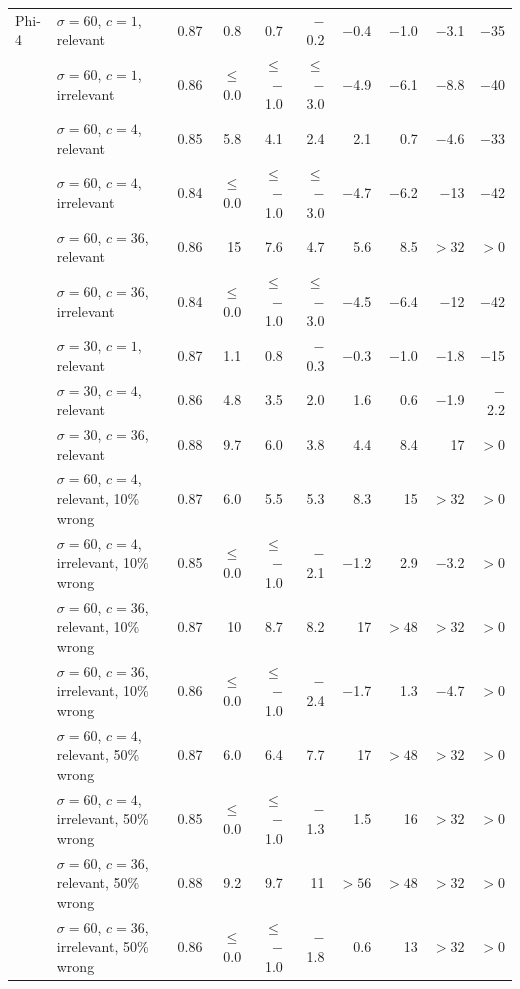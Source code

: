 \begin{tabular}{llrrrrrrrr}
\midrule
Phi-4 & $\sigma = 60$, $c = 1$, relevant & 0.87 & 0.8 & 0.7 & $-$0.2 & $-$0.4 & $-$1.0 & $-$3.1 & $-$35 \\
 & $\sigma = 60$, $c = 1$, irrelevant & 0.86 & $\leq$ 0.0 & $\leq$ $-$1.0 & $\leq$ $-$3.0 & $-$4.9 & $-$6.1 & $-$8.8 & $-$40 \\
 & $\sigma = 60$, $c = 4$, relevant & 0.85 & 5.8 & 4.1 & 2.4 & 2.1 & 0.7 & $-$4.6 & $-$33 \\
 & $\sigma = 60$, $c = 4$, irrelevant & 0.84 & $\leq$ 0.0 & $\leq$ $-$1.0 & $\leq$ $-$3.0 & $-$4.7 & $-$6.2 & $-$13 & $-$42 \\
 & $\sigma = 60$, $c = 36$, relevant & 0.86 & 15 & 7.6 & 4.7 & 5.6 & 8.5 & $> 32$ & $> 0$ \\
 & $\sigma = 60$, $c = 36$, irrelevant & 0.84 & $\leq$ 0.0 & $\leq$ $-$1.0 & $\leq$ $-$3.0 & $-$4.5 & $-$6.4 & $-$12 & $-$42 \\
 & $\sigma = 30$, $c = 1$, relevant & 0.87 & 1.1 & 0.8 & $-$0.3 & $-$0.3 & $-$1.0 & $-$1.8 & $-$15 \\
 & $\sigma = 30$, $c = 4$, relevant & 0.86 & 4.8 & 3.5 & 2.0 & 1.6 & 0.6 & $-$1.9 & $-$2.2 \\
 & $\sigma = 30$, $c = 36$, relevant & 0.88 & 9.7 & 6.0 & 3.8 & 4.4 & 8.4 & 17 & $> 0$ \\
 & $\sigma = 60$, $c = 4$, relevant, 10\% wrong & 0.87 & 6.0 & 5.5 & 5.3 & 8.3 & 15 & $> 32$ & $> 0$ \\
 & $\sigma = 60$, $c = 4$, irrelevant, 10\% wrong & 0.85 & $\leq$ 0.0 & $\leq$ $-$1.0 & $-$2.1 & $-$1.2 & 2.9 & $-$3.2 & $> 0$ \\
 & $\sigma = 60$, $c = 36$, relevant, 10\% wrong & 0.87 & 10 & 8.7 & 8.2 & 17 & $> 48$ & $> 32$ & $> 0$ \\
 & $\sigma = 60$, $c = 36$, irrelevant, 10\% wrong & 0.86 & $\leq$ 0.0 & $\leq$ $-$1.0 & $-$2.4 & $-$1.7 & 1.3 & $-$4.7 & $> 0$ \\
 & $\sigma = 60$, $c = 4$, relevant, 50\% wrong & 0.87 & 6.0 & 6.4 & 7.7 & 17 & $> 48$ & $> 32$ & $> 0$ \\
 & $\sigma = 60$, $c = 4$, irrelevant, 50\% wrong & 0.85 & $\leq$ 0.0 & $\leq$ $-$1.0 & $-$1.3 & 1.5 & 16 & $> 32$ & $> 0$ \\
 & $\sigma = 60$, $c = 36$, relevant, 50\% wrong & 0.88 & 9.2 & 9.7 & 11 & $> 56$ & $> 48$ & $> 32$ & $> 0$ \\
 & $\sigma = 60$, $c = 36$, irrelevant, 50\% wrong & 0.86 & $\leq$ 0.0 & $\leq$ $-$1.0 & $-$1.8 & 0.6 & 13 & $> 32$ & $> 0$ \\
\midrule

\end{tabular}
